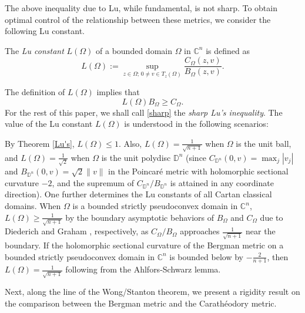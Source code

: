 \documentclass[12pt] {article}
\numberwithin{equation}{section}
\begin{document}
 

The above inequality due to Lu, while fundamental, is not sharp. To obtain optimal control of the relationship between these metrics, we consider the following Lu constant. 





     \medskip

 The {\it Lu constant} $L(\Omega)$ of a bounded domain $\Omega$ in $\mathbb{C}^n$ is defined as
$$
L(\Omega) := \sup_{z \in \Omega; \, 0 \neq v \in T_z(\Omega)} \frac{C_{\Omega}(z, v)}{B_{\Omega}(z, v)}.
$$

\medskip

The definition of $L(\Omega)$ implies that
\begin{equation} \label{sharp}
L(\Omega) B_\Omega \geq C_\Omega.
\end{equation}
For the rest of this paper, we shall call \eqref{sharp} the  {\it sharp Lu's inequality}. The value of the Lu constant $L(\Omega)$ is understood in the following scenarios:


\medskip
 
By Theorem \ref{Lu's}, \(L(\Omega) \leq 1\). 
Also, \(L(\Omega) = \frac{1}{\sqrt{n+1}}\) when \(\Omega\) is the unit ball, and \(L(\Omega) = \frac{1}{\sqrt{2}}\) when \(\Omega\) is the unit polydisc \(\mathbb{D}^n\) (since $C_{\mathbb{D}^n}(0,v) = \max_j |v_j|$ and $B_{\mathbb{D}^n}(0,v) = \sqrt{2}\|v\|$ in the Poincar\'e metric with holomorphic sectional curvature $-2$, and the supremum of $C_{\mathbb{D}^n}/B_{\mathbb{D}^n}$ is attained in any coordinate direction). One further determines the Lu constants of all Cartan classical domains.
When $\Omega$ is a bounded strictly pseudoconvex domain in $\mathbb{C}^n$, $L(\Omega) \geq \frac{1}{\sqrt{n+1}}$ by the boundary asymptotic behaviors of $B_{\Omega}$ and $C_{\Omega}$ due to Diederich \cite{Di} and Graham \cite{G}, respectively, as $C_\Omega/B_\Omega$ approaches $\frac{1}{\sqrt{n+1}}$ near the boundary.
 If the holomorphic sectional curvature of the Bergman metric on a bounded strictly pseudoconvex domain in $\mathbb{C}^n$ is bounded below by $-\frac{2}{n+1}$, then \(L(\Omega) = \frac{1}{\sqrt{n+1}}\) following from the Ahlfors-Schwarz lemma.
                 
 

 \medskip

Next, along the line of the Wong/Stanton theorem, we present a rigidity result on the comparison between the Bergman metric and  the Carath\'eodory metric.
\end{document}
